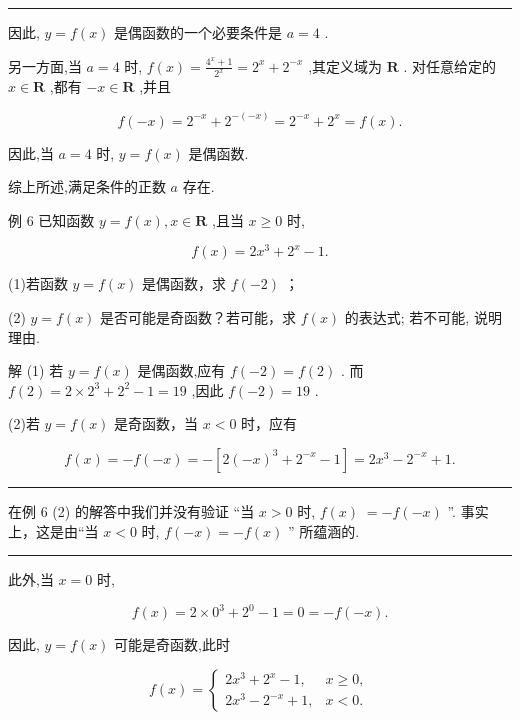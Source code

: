 \documentclass[10pt]{article}
\newcommand{\HRule}{\begin{center}\rule{0.9\linewidth}{0.2mm}\end{center}}
\begin{document}
\HRule

因此, \(y = f\left( x\right)\) 是偶函数的一个必要条件是 \(a = 4\) .

另一方面,当 \(a = 4\) 时, \(f\left( x\right)  = \frac{{4}^{x} + 1}{{2}^{x}} = {2}^{x} + {2}^{-x}\) ,其定义域为 \(\mathbf{R}\) . 对任意给定的 \(x \in  \mathbf{R}\) ,都有 \(- x \in  \mathbf{R}\) ,并且

\[
f\left( {-x}\right)  = {2}^{-x} + {2}^{-\left( {-x}\right) } = {2}^{-x} + {2}^{x} = f\left( x\right) .
\]

因此,当 \(a = 4\) 时, \(y = f\left( x\right)\) 是偶函数.

综上所述,满足条件的正数 \(a\) 存在.

例 6 已知函数 \(y = f\left( x\right) ,x \in  \mathbf{R}\) ,且当 \(x \geq  0\) 时,

\[
f\left( x\right)  = 2{x}^{3} + {2}^{x} - 1.
\]

(1)若函数 \(y = f\left( x\right)\) 是偶函数，求 \(f\left( {-2}\right)\) ；

(2) \(y = f\left( x\right)\) 是否可能是奇函数？若可能，求 \(f\left( x\right)\) 的表达式; 若不可能, 说明理由.

解 (1) 若 \(y = f\left( x\right)\) 是偶函数,应有 \(f\left( {-2}\right)  = f\left( 2\right)\) . 而 \(f\left( 2\right)  = 2 \times  {2}^{3} + {2}^{2} - 1 = {19}\) ,因此 \(f\left( {-2}\right)  = {19}\) .

(2)若 \(y = f\left( x\right)\) 是奇函数，当 \(x < 0\) 时，应有

\[
f\left( x\right)  =  - f\left( {-x}\right)  =  - \left\lbrack  {2{\left( -x\right) }^{3} + {2}^{-x} - 1}\right\rbrack   = 2{x}^{3} - {2}^{-x} + 1.
\]

\HRule

在例 6 (2) 的解答中我们并没有验证 “当 \(x > 0\) 时, \(f\left( x\right) \; =  - f\left( {-x}\right)\) ”. 事实上，这是由“当 \(x < 0\) 时, \(f\left( {-x}\right)  =  - f\left( x\right)\) ” 所蕴涵的.

\HRule

此外,当 \(x = 0\) 时,

\[
f\left( x\right)  = 2 \times  {0}^{3} + {2}^{0} - 1 = 0 =  - f\left( {-x}\right) .
\]

因此, \(y = f\left( x\right)\) 可能是奇函数,此时

\[
f\left( x\right)  = \left\{  \begin{array}{ll} 2{x}^{3} + {2}^{x} - 1, & x \geq  0, \\  2{x}^{3} - {2}^{-x} + 1, & x < 0. \end{array}\right.
\]
\end{document}

